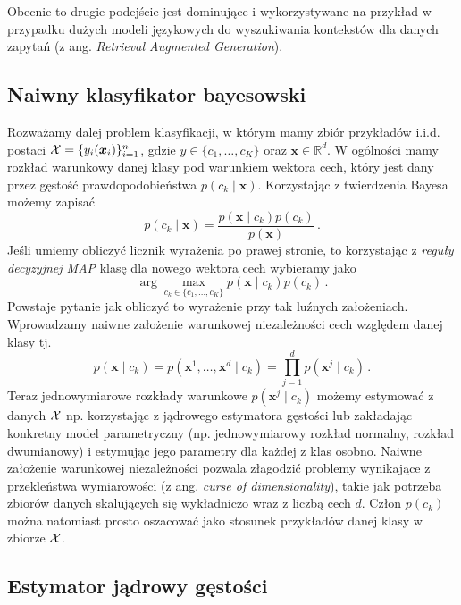 \documentclass{myclass}
\numberwithin{equation}{subsection}
\begin{document}
Obecnie to drugie podejście jest dominujące i wykorzystywane na przykład w przypadku dużych modeli
językowych do wyszukiwania kontekstów dla danych zapytań (z ang. \textit{Retrieval Augmented
Generation}).


\subsection{Naiwny klasyfikator bayesowski}

Rozważamy dalej problem klasyfikacji, w którym mamy zbiór przykładów i.i.d. postaci \(\mathcal{X} =
\{y_i(\bm{x}_i)\}_{i=1}^n\), gdzie \(y \in \{c_1, \ldots, c_K\} \) oraz \(\bm{x} \in \mathbb{R}^d\).
W ogólności mamy rozkład warunkowy danej klasy pod warunkiem wektora cech, który jest dany przez
gęstość prawdopodobieństwa \(p(c_k \mid \bm{x})\). Korzystając z twierdzenia Bayesa możemy zapisać
\begin{equation}
    p(c_k \mid \bm{x}) = \frac{p(\bm{x} \mid c_k) p(c_k)}{p(\bm{x})}\,.
\end{equation}
Jeśli umiemy obliczyć licznik wyrażenia po prawej stronie, to korzystając z \emph{reguły decyzyjnej
MAP} klasę dla nowego wektora cech wybieramy jako
\begin{equation}
    \arg\max_{c_k \in \{c_1, \ldots, c_K\}} p(\bm{x} \mid c_k) p(c_k)\,.
\end{equation}
Powstaje pytanie jak obliczyć to wyrażenie przy tak luźnych założeniach. Wprowadzamy naiwne
założenie warunkowej niezależności cech względem danej klasy tj.
\begin{equation}
    p(\bm{x} \mid c_k) = p(\bm{x}^1, \ldots, \bm{x}^d \mid c_k) = \prod_{j=1}^d p(\bm{x}^j \mid c_k)\,.
\end{equation}
Teraz jednowymiarowe rozkłady warunkowe \(p(\bm{x}^j \mid c_k)\) możemy estymować z danych
\(\mathcal{X}\) np. korzystając z jądrowego estymatora gęstości lub zakładając konkretny model
parametryczny (np. jednowymiarowy rozkład normalny, rozkład dwumianowy) i estymując jego parametry
dla każdej z klas osobno. Naiwne założenie warunkowej niezależności pozwala złagodzić problemy
wynikające z przekleństwa wymiarowości (z ang. \textit{curse of dimensionality}), takie jak potrzeba
zbiorów danych skalujących się wykładniczo wraz z liczbą cech \(d\). Człon \(p(c_k)\) można
natomiast prosto oszacować jako stosunek przykładów danej klasy w zbiorze \(\mathcal{X}\).


\subsection{Estymator jądrowy gęstości}
\end{document}
